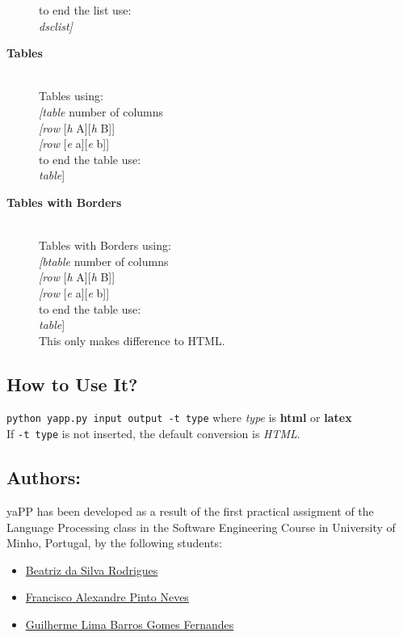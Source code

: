 \documentclass{article}
\begin{document}
\begin{description}
to end the list use:\\
\textit{dsclist\textit{]}}
\item[\textbf{Tables}]\\
Tables using:\\
\textit{[table} number of columns\\
\textit{[row} [\textit{h} A][\textit{h} B]]\\
\textit{[row} [\textit{e} a][\textit{e} b]]\\
to end the table use:\\
\textit{table}]
\item[\textbf{Tables with Borders}]\\
Tables with Borders using:\\
\textit{[btable} number of columns\\
\textit{[row} [\textit{h} A][\textit{h} B]]\\
\textit{[row} [\textit{e} a][\textit{e} b]]\\
to end the table use:\\
\textit{table}]\\
This only makes difference to HTML.
\end{description}
 \subsection{How to Use It?}
\texttt{python yapp.py input output -t type} where \textit{type} is \textbf{html} or \textbf{latex}\\
 If \texttt{-t type} is not inserted, the default conversion is \textit{HTML}. \subsection{Authors:}
yaPP has been developed as a result of the first practical assigment of the Language Processing class in the Software Engineering Course in University of Minho, Portugal, by the following students:\\
 
\begin{itemize}
\item \href{https://github.com/beasrodrigues24}{Beatriz da Silva Rodrigues}
\item \href{https://github.com/franl08}{Francisco Alexandre Pinto Neves}
\item \href{https://github.com/zer0-5}{Guilherme Lima Barros Gomes Fernandes}
\end{itemize}
\end{document}

